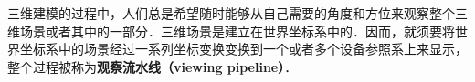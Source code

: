 

三维建模的过程中，人们总是希望随时能够从自己需要的角度和方位来观察整个三维场景或者其中的一部分．三维场景是建立在世界坐标系中的．因而，就须要将世界坐标系中的场景经过一系列坐标变换变换到一个或者多个设备参照系上来显示，整个过程被称为\textbf{观察流水线（viewing pipeline）}．
